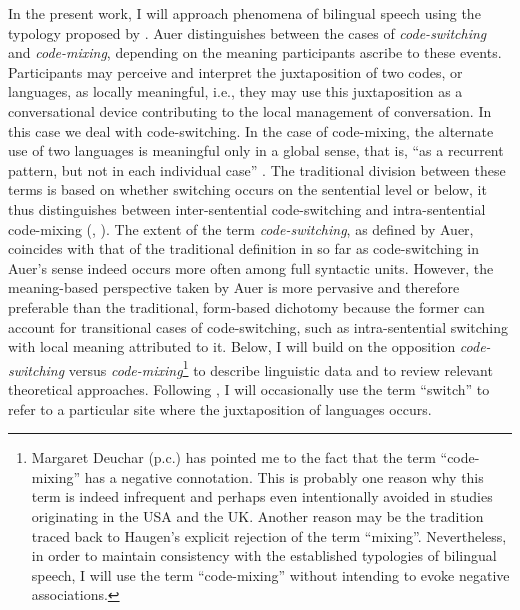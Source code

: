 In the present work, I will approach phenomena of bilingual speech using the typology proposed by \citet{auer-codeswitching-1999}. Auer distinguishes between the cases of \textit{code-switching} and \textit{code-mixing}, depending on the meaning participants ascribe to these events. Participants may perceive and interpret the juxtaposition of two codes, or languages, as locally meaningful, i.e., they may use this juxtaposition as a conversational device contributing to the local management of conversation. In this case  we deal with code-switching. In the case of code-mixing,  the alternate use of two languages is meaningful only in a global sense, that is, ``as a recurrent pattern, but not in each individual case'' \citep[467]{wodak-code-switching-2011}. The traditional division between these terms is based on whether switching occurs on the sentential level or below, it thus distinguishes between inter-sentential code-switching and intra-sentential code-mixing (\citealt[cf.][467]{wodak-code-switching-2011}, \citealt[70--73]{clyne-dynamics-2003}). The extent of the term \textit{code-switching}, as defined by Auer, coincides with that of the traditional definition in so far as code-switching in Auer's sense indeed occurs more often among full syntactic units. However, the meaning-based perspective taken by Auer is more pervasive and therefore  preferable than the traditional, form-based dichotomy because the former can account for transitional cases of code-switching, such as intra-sentential switching with local meaning attributed to it. Below, I will build on the opposition \textit{code-switching} versus \textit{code-mixing}\footnote{Margaret Deuchar (p.c.) has pointed me to the fact that the term ``code-mixing'' has a negative connotation. This is probably one reason why this term is indeed infrequent and perhaps even intentionally avoided in studies originating in the USA and the UK. Another reason may be the tradition traced back to Haugen's explicit rejection of the term ``mixing''. Nevertheless, in order to maintain consistency with the established typologies of bilingual speech, I will use the term ``code-mixing'' without intending to evoke negative associations.}
to describe linguistic data and to review relevant theoretical approaches. Following \citet{muysken-bilingual-2000}, I will occasionally use the term ``switch'' to refer to a particular site where the juxtaposition of languages occurs.

